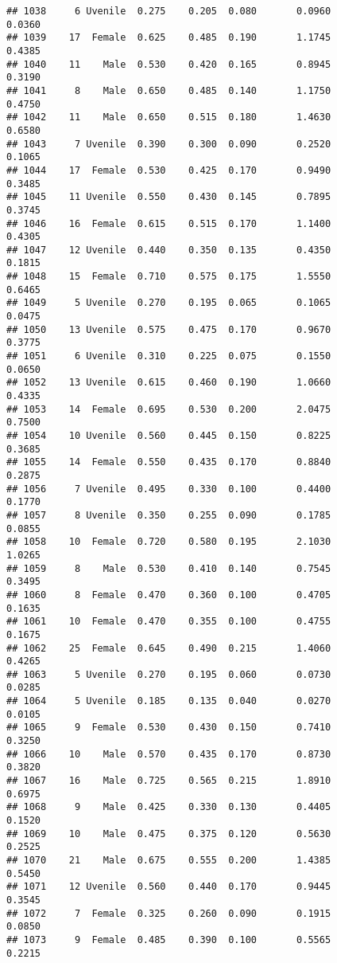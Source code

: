 \documentclass[
]{article}
\begin{document}
\begin{verbatim}
## 1038     6 Uvenile  0.275    0.205  0.080       0.0960         0.0360
## 1039    17  Female  0.625    0.485  0.190       1.1745         0.4385
## 1040    11    Male  0.530    0.420  0.165       0.8945         0.3190
## 1041     8    Male  0.650    0.485  0.140       1.1750         0.4750
## 1042    11    Male  0.650    0.515  0.180       1.4630         0.6580
## 1043     7 Uvenile  0.390    0.300  0.090       0.2520         0.1065
## 1044    17  Female  0.530    0.425  0.170       0.9490         0.3485
## 1045    11 Uvenile  0.550    0.430  0.145       0.7895         0.3745
## 1046    16  Female  0.615    0.515  0.170       1.1400         0.4305
## 1047    12 Uvenile  0.440    0.350  0.135       0.4350         0.1815
## 1048    15  Female  0.710    0.575  0.175       1.5550         0.6465
## 1049     5 Uvenile  0.270    0.195  0.065       0.1065         0.0475
## 1050    13 Uvenile  0.575    0.475  0.170       0.9670         0.3775
## 1051     6 Uvenile  0.310    0.225  0.075       0.1550         0.0650
## 1052    13 Uvenile  0.615    0.460  0.190       1.0660         0.4335
## 1053    14  Female  0.695    0.530  0.200       2.0475         0.7500
## 1054    10 Uvenile  0.560    0.445  0.150       0.8225         0.3685
## 1055    14  Female  0.550    0.435  0.170       0.8840         0.2875
## 1056     7 Uvenile  0.495    0.330  0.100       0.4400         0.1770
## 1057     8 Uvenile  0.350    0.255  0.090       0.1785         0.0855
## 1058    10  Female  0.720    0.580  0.195       2.1030         1.0265
## 1059     8    Male  0.530    0.410  0.140       0.7545         0.3495
## 1060     8  Female  0.470    0.360  0.100       0.4705         0.1635
## 1061    10  Female  0.470    0.355  0.100       0.4755         0.1675
## 1062    25  Female  0.645    0.490  0.215       1.4060         0.4265
## 1063     5 Uvenile  0.270    0.195  0.060       0.0730         0.0285
## 1064     5 Uvenile  0.185    0.135  0.040       0.0270         0.0105
## 1065     9  Female  0.530    0.430  0.150       0.7410         0.3250
## 1066    10    Male  0.570    0.435  0.170       0.8730         0.3820
## 1067    16    Male  0.725    0.565  0.215       1.8910         0.6975
## 1068     9    Male  0.425    0.330  0.130       0.4405         0.1520
## 1069    10    Male  0.475    0.375  0.120       0.5630         0.2525
## 1070    21    Male  0.675    0.555  0.200       1.4385         0.5450
## 1071    12 Uvenile  0.560    0.440  0.170       0.9445         0.3545
## 1072     7  Female  0.325    0.260  0.090       0.1915         0.0850
## 1073     9  Female  0.485    0.390  0.100       0.5565         0.2215

\end{verbatim}
\end{document}
